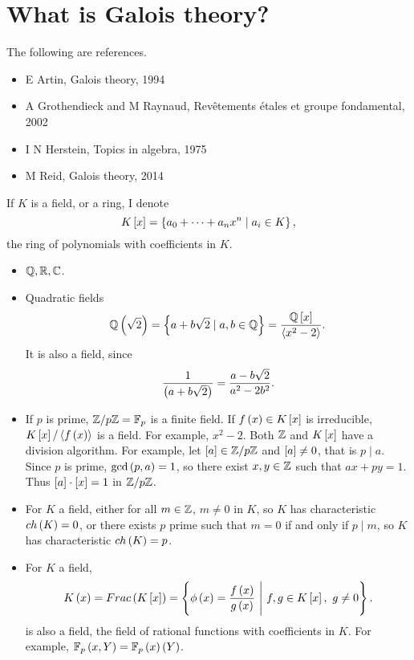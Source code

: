 \def\module{M3P11 Galois Theory}
\def\lecturer{Prof Alessio Corti}
\def\term{Spring 2019}

\def\thm{section}







\section{What is Galois theory?}


The following are references.
\begin{itemize}
\item E Artin, Galois theory, 1994
\item A Grothendieck and M Raynaud, Rev\^etements \'etales et groupe fondamental, 2002
\item I N Herstein, Topics in algebra, 1975
\item M Reid, Galois theory, 2014
\end{itemize}

\begin{notation*}
If $ K $ is a field, or a ring, I denote
$$ K\sb{x} = \cb{a_0 + \dots + a_nx^n \mid a_i \in K}, $$
the ring of polynomials with coefficients in $ K $.
\end{notation*}

\begin{example*}
\hfill
\begin{itemize}
\item $ \Q, \R, \C $.
\item Quadratic fields
$$ \Q\rb{\sqrt{2}} = \cb{a + b\sqrt{2} \mid a, b \in \Q} = \dfrac{\Q\sb{x}}{\ab{x^2 - 2}}. $$
It is also a field, since
$$ \dfrac{1}{\rb{a + b\sqrt{2}}} = \dfrac{a - b\sqrt{2}}{a^2 - 2b^2}. $$
\item If $ p $ is prime, $ \Z / p\Z = \F_p $ is a finite field. If $ f\rb{x} \in K\sb{x} $ is irreducible, $ K\sb{x} / \ab{f\rb{x}} $ is a field. For example, $ x^2 - 2 $. Both $ \Z $ and $ K\sb{x} $ have a division algorithm. For example, let $ \sb{a} \in \Z / p\Z $ and $ \sb{a} \ne 0 $, that is $ p \mid a $. Since $ p $ is prime, $ \gcd\rb{p, a} = 1 $, so there exist $ x, y \in \Z $ such that $ ax + py = 1 $. Thus $ \sb{a} \cdot \sb{x} = 1 $ in $ \Z / p\Z $.
\item For $ K $ a field, either for all $ m \in \Z $, $ m \ne 0 $ in $ K $, so $ K $ has characteristic $ ch\rb{K} = 0 $, or there exists $ p $ prime such that $ m = 0 $ if and only if $ p \mid m $, so $ K $ has characteristic $ ch\rb{K} = p $.
\item For $ K $ a field,
$$ K\rb{x} = Frac\rb{K\sb{x}} = \cb{\phi\rb{x} = \dfrac{f\rb{x}}{g\rb{x}} \ \Bigg| \ f, g \in K\sb{x}, \ g \ne 0}. $$
is also a field, the field of rational functions with coefficients in $ K $. For example, $ \F_p\rb{x, Y} = \F_p\rb{x}\rb{Y} $.
\end{itemize}
\end{example*}

